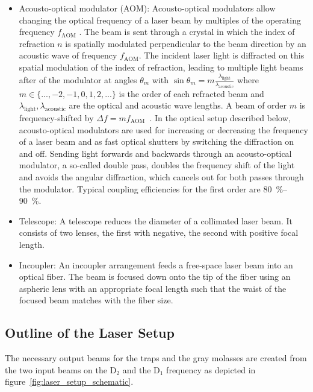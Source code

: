 \begin{itemize}
    \item Acousto-optical modulator (AOM): Acousto-optical modulators allow changing the optical frequency of a laser beam by multiples of the operating frequency $f_\text{AOM}$ . The beam is sent through a crystal in which the index of refraction $n$ is spatially modulated perpendicular to the beam direction by an acoustic wave of frequency $f_\text{AOM}$. The incident laser light is diffracted on this spatial modulation of the index of refraction, leading to multiple light beams after of the modulator at angles $\theta_m$ with $\sin \theta_m = m\frac{\lambda_\text{light}}{\lambda_\text{acoustic}}$ where $m \in \{..., -2, -1, 0, 1, 2, ...\}$ is the order of each refracted beam and $\lambda_\text{light}, \lambda_\text{acoustic}$ are the optical and acoustic wave lengths. A beam of order $m$ is frequency-shifted by $\Delta f = mf_\text{AOM}$~\cite{hunsperger_acousto-optic_2002}. In the optical setup described below, acousto-optical modulators are used for increasing or decreasing the frequency of a laser beam and as fast optical shutters by switching the diffraction on and off. Sending light forwards and backwards through an acousto-optical modulator, a so-called double pass, doubles the frequency shift of the light and avoids the angular diffraction, which cancels out for both passes through the modulator. Typical coupling efficiencies for the first order are \SIrange[]{80}{90}{\percent}.
    \item Telescope: A telescope reduces the diameter of a collimated laser beam. It consists of two lenses, the first with negative, the second with positive focal length.
    \item Incoupler: An incoupler arrangement feeds a free-space laser beam into an optical fiber. The beam is focused down onto the tip of the fiber using an aspheric lens with an appropriate focal length such that the waist of the focused beam matches with the fiber size.
\end{itemize}

\subsection*{Outline of the Laser Setup}
The necessary output beams for the traps and the gray molasses are created from the two input beams on the D$_2$ and the D$_1$ frequency as depicted in figure~\ref{fig:laser_setup_schematic}.



